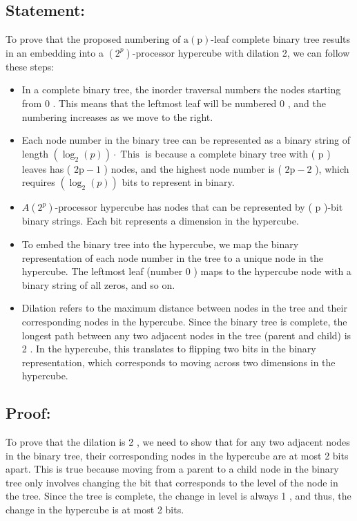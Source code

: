 \documentclass{article}
\begin{document}
\subsection{Statement:}To prove that the proposed numbering of $\mathrm{a}(\mathrm{p})$-leaf complete binary tree results in an embedding into a $\left(2^p\right)$-processor hypercube with dilation 2, we can follow these steps:\par
\begin{itemize}
    \item In a complete binary tree, the inorder traversal numbers the nodes starting from 0 . This means that the leftmost leaf will be numbered 0 , and the numbering increases as we move to the right.
    \item Each node number in the binary tree can be represented as a binary string of length $\left(\log _2(p)\right) \cdot \operatorname{This}$ is because a complete binary tree with ( $\mathrm{p}$ ) leaves has ( $2 \mathrm{p}-1$ ) nodes, and the highest node number is ( $2 \mathrm{p}-2$ ), which requires $\left(\log _2(p)\right)$ bits to represent in binary.
    \item $A\left(2^p\right)$-processor hypercube has nodes that can be represented by ( $\mathrm{p}$ )-bit binary strings. Each bit represents a dimension in the hypercube.
    \item To embed the binary tree into the hypercube, we map the binary representation of each node number in the tree to a unique node in the hypercube. The leftmost leaf (number 0 ) maps to the hypercube node with a binary string of all zeros, and so on.
    \item Dilation refers to the maximum distance between nodes in the tree and their corresponding nodes in the hypercube. Since the binary tree is complete, the longest path between any two adjacent nodes in the tree (parent and child) is 2 . In the hypercube, this translates to flipping two bits in the binary representation, which corresponds to moving across two dimensions in the hypercube.
\end{itemize}
\subsection{Proof: }To prove that the dilation is 2 , we need to show that for any two adjacent nodes in the binary tree, their corresponding nodes in the hypercube are at most 2 bits apart. This is true because moving from a parent to a child node in the binary tree only involves changing the bit that corresponds to the level of the node in the tree. Since the tree is complete, the change in level is always 1 , and thus, the change in the hypercube is at most 2 bits.\par
\end{document}
